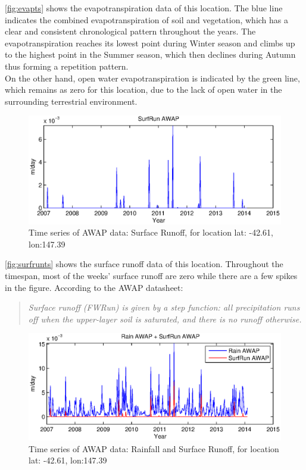 \newline
\autoref{fig:evapts} shows the evapotranspiration data of this location. The blue line indicates the combined evapotranspiration of soil and vegetation, which has a clear and consistent chronological pattern throughout the years. The evapotranspiration reaches its lowest point during Winter season and climbs up to the highest point in the Summer season, which then declines during Autumn thus forming a repetition pattern. \\
On the other hand, open water evapotranspiration is indicated by the green line, which remains as zero for this location, due to the lack of open water in the surrounding terrestrial environment.\\
\begin{figure}[hbt]
\begin{center}
\includegraphics[width=\linewidth]{gfx/surfrunts.eps}
\end{center}
\caption{Time series of AWAP data: Surface Runoff, for location lat: -42.61, lon:147.39}
\label{fig:surfrunts}
\end{figure}
\newline
\autoref{fig:surfrunts} shows the surface runoff data of this location. Throughout the timespan, most of the weeks' surface runoff are zero while there are a few spikes in the figure. According to the AWAP datasheet\citep{Raupach2009}:
\begin{quote}
\emph{Surface runoff (FWRun) is given by a step function: all precipitation runs off when the upper-layer soil is saturated, and there is no runoff otherwise.}
\end{quote}
\begin{figure}[hbt]
\begin{center}
\includegraphics[width=\linewidth]{gfx/rainsurfts.eps}
\end{center}
\caption{Time series of AWAP data: Rainfall and Surface Runoff, for location lat: -42.61, lon:147.39}
\label{fig:rainsurfts}
\end{figure}
